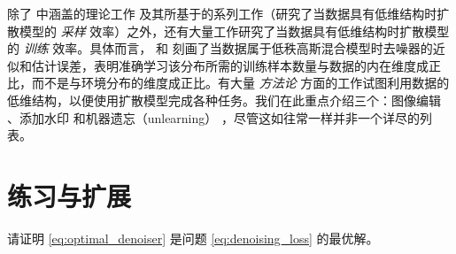\documentclass[../../book-main_zh.tex]{subfiles}
\begin{document}
除了  中涵盖的理论工作 \citep{li2024d} 及其所基于的系列工作（研究了当数据具有低维结构时扩散模型的 \textit{采样} 效率）之外，还有大量工作研究了当数据具有低维结构时扩散模型的 \textit{训练} 效率。具体而言，\citet{chen2023score} 和 \citep{wang2024diffusion} 刻画了当数据属于低秩高斯混合模型时去噪器的近似和估计误差，表明准确学习该分布所需的训练样本数量与数据的内在维度成正比，而不是与环境分布的维度成正比。有大量 \textit{方法论} 方面的工作试图利用数据的低维结构，以便使用扩散模型完成各种任务。我们在此重点介绍三个：图像编辑 \citep{chen2024exploring}、添加水印 \citep{li2024shallow} 和机器遗忘（unlearning） \citep{chen2025dual}，尽管这如往常一样并非一个详尽的列表。

\section{练习与扩展}

\begin{exercise}
    请证明 \eqref{eq:optimal_denoiser} 是问题 \eqref{eq:denoising_loss} 的最优解。
\end{exercise}
\end{document}

